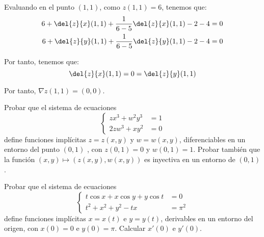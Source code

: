 \begin{ejercicio}
    Evaluando en el punto $(1,1)$, como $z(1,1)=6$, tenemos que:
    \begin{align*}
        6 + \del{z}{x}(1,1) + \frac{1}{6-5}\del{z}{x}(1,1) - 2 - 4 &= 0 \\
        6 + \del{z}{y}(1,1) + \frac{1}{6-5}\del{z}{y}(1,1) - 2 - 4 &= 0
    \end{align*}

    Por tanto, tenemos que:
    \begin{equation*}
        \del{z}{x}(1,1) = 0 = \del{z}{y}(1,1)
    \end{equation*}

    Por tanto, $\nabla z(1,1) = (0,0)$.
\end{ejercicio}


\begin{ejercicio}
    Probar que el sistema de ecuaciones
    \begin{equation*}
        \left\{
            \begin{array}{ll}
                zx^3 + w^2y^3 &= 1 \\
                2zw^3 + xy^2 &= 0
            \end{array}
        \right.
    \end{equation*}
    define funciones implícitas $z = z(x, y)$ y $w = w(x, y)$, diferenciables en un entorno
    del punto $(0,1)$ , con $z(0,1)=0$ y $w(0,1) = 1$. Probar también que
    la función $(x,y) \mapsto (z(x,y), w(x,y))$ es inyectiva en un entorno de $(0,1)$.\\
\end{ejercicio}


\begin{ejercicio}
    Probar que el sistema de ecuaciones
    \begin{equation*}
        \left\{
            \begin{array}{ll}
                t\cos x + x\cos y + y\cos t &= 0 \\
                t^2 + x^2 + y^2 - tx &= \pi^2
            \end{array}
        \right.
    \end{equation*}
    define funciones implícitas $x=x(t)$ e $y=y(t)$, derivables en un entorno
    del origen, con $x(0)=0$ e $y(0)=\pi$. Calcular $x'(0)$ e $y'(0)$.\\
\end{ejercicio}


